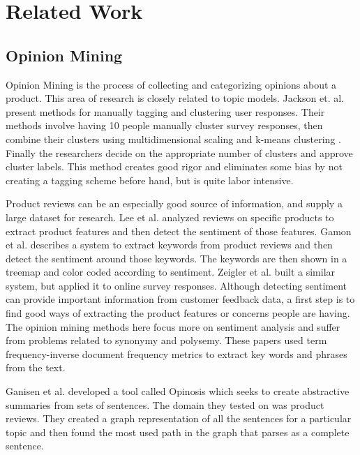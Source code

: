 \chapter{Related Work}
\section{Opinion Mining}
Opinion Mining is the process of collecting and categorizing opinions about a product.  This area of research is closely related to topic models.  Jackson et. al. \cite{jackson2002concept} present methods for manually tagging and clustering user responses.  Their methods involve having 10 people manually cluster survey responses, then combine their clusters using multidimensional scaling \cite{kruskal1978multidimensional} and k-means clustering \cite{Hartigan1979algorithm}.  Finally the researchers decide on the appropriate number of clusters and approve cluster labels.  This method creates good rigor and eliminates some bias by not creating a tagging scheme before hand, but is quite labor intensive.

Product reviews can be an especially good source of information, and supply a large dataset for research.  Lee et al. \cite{lee2008opinion} analyzed reviews on specific products to extract product features and then detect the sentiment of those features. Gamon et al. \cite{gamon2005pulse} describes a system to extract keywords from product reviews and then detect the sentiment around those keywords.  The keywords are then shown in a treemap and color coded according to sentiment.  Zeigler et al. \cite{ziegler2008mining} built a similar system, but applied it to online survey responses.  Although detecting sentiment can provide important information from customer feedback data, a first step is to find good ways of extracting the product features or concerns people are having.  The opinion mining methods here focus more on sentiment analysis and suffer from problems related to synonymy and polysemy.  These papers used term frequency-inverse document frequency \cite{sparck1972statistical} metrics to extract key words and phrases from the text.

Ganisen et al. \cite{ganesan2010opinosis} developed a tool called Opinosis which seeks to create abstractive summaries from sets of sentences.  The domain they tested on was product reviews.  They created a graph representation of all the sentences for a particular topic and then found the most used path in the graph that parses as a complete sentence.

